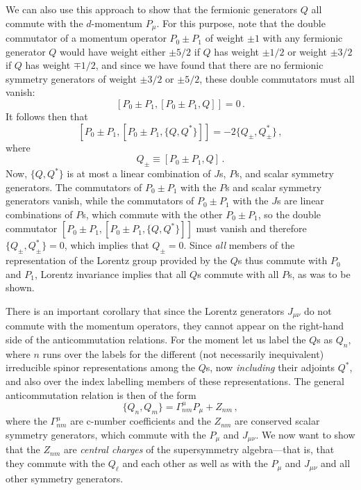 We can also use this approach to show that the fermionic generators \(Q\)
all commute with the \(d\)-momentum \(P_\mu\). For this purpose, note that
the double commutator of a momentum operator \(P_0\pm P_1\) of weight
\(\pm1\) with any fermionic generator \(Q\) would have weight either
\(\pm5/2\) if \(Q\) has weight \(\pm1/2\) or weight \(\pm3/2\) if \(Q\)
has weight \(\mp1/2\), and since we have found that there are no fermionic
symmetry generators of weight \(\pm3/2\) or \(\pm5/2\), these double
commutators must all vanish:
\[
  [P_0\pm P_1,[P_0\pm P_1,Q]]=0\,.
\]
It follows then that
\[
  [P_0\pm P_1,[P_0\pm P_1,\{Q,Q^*\}]]
  =-2\{Q_\pm,Q_\pm^*\}\,,
\]
where
\[
  Q_\pm\equiv[P_0\pm P_1,Q]\,.
\]
Now, \(\{Q,Q^*\}\) is at most a linear combination of \(J\)s, \(P\)s,
and scalar symmetry generators. The commutators of \(P_0\pm P_1\) with
the \(P\)s and scalar symmetry generators vanish, while the commutators of
\(P_0\pm P_1\) with the \(J\)s are linear combinations of \(P\)s, which
commute with the other \(P_0\pm P_1\), so the double commutator
\([P_0\pm P_1,[P_0\pm P_1,\{Q,Q^*\}]]\) must vanish and therefore
\(\{Q_\pm,Q_\pm^*\}=0\), which implies that \(Q_\pm=0\). Since
\textit{all} members of the representation of the Lorentz group provided
by the \(Q\)s thus commute with \(P_0\) and \(P_1\), Lorentz invariance
implies that all \(Q\)s commute with all \(P\)s, as was to be shown.

There is an important corollary that since the Lorentz generators
\(J_{\mu\nu}\) do not commute with the momentum operators, they cannot
appear on the right-hand side of the anticommutation relations. For the
moment let us label the \(Q\)s as \(Q_n\), where \(n\) runs over the labels
for the different (not necessarily inequivalent) irreducible spinor
representations among the \(Q\)s, now \textit{including} their adjoints
\(Q^*\), and also over the index labelling members of these representations.
The general anticommutation relation is then of the form
\begin{equation}
  \{Q_n,Q_m\}=\Gamma^\mu_{nm}P_\mu+Z_{nm}\,,
  \tag{32.1.5}\label{eq:32.1.5}
\end{equation}
where the \(\Gamma^\mu_{nm}\) are c-number coefficients and the \(Z_{nm}\)
are conserved scalar symmetry generators, which commute with the \(P_\mu\)
and \(J_{\mu\nu}\). We now want to show that the \(Z_{nm}\) are
\textit{central charges} of the supersymmetry algebra---that is, that they
commute with the \(Q_\ell\) and each other as well as with the \(P_\mu\)
and \(J_{\mu\nu}\) and all other symmetry generators.


